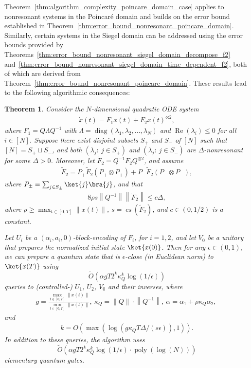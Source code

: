 \documentclass[superscriptaddress,onecolumn,nofootinbib,longbibliography,a4paper,accepted=2026-09-29]{quantumarticle}
\theoremstyle{plain}
\newtheorem{thm}{Theorem}
\theoremstyle{definition}
\numberwithin{thm}{section}
\numberwithin{assumption}{section}
\numberwithin{lemma}{section}
\numberwithin{prop}{section}
\numberwithin{cor}{section}
\numberwithin{definition}{section}
\numberwithin{rmk}{section}
\numberwithin{equation}{section}
\newcommand{\norm}[1]     {\left\| #1 \right\|}
\newcommand{\ot}{\otimes}
\newcommand{\lrb}[1]{\left ( #1 \right )}
\newcommand{\realpart}[1]{\operatorname{Re}\lrb{#1}}
\newcommand{\mypoly}[1]{\operatorname{poly} \lrb{#1}}
\newcommand{\mylog}[1]{\operatorname{log} \lrb{#1}}
\newcommand{\myO}[1]{O\lrb{#1}}
\newcommand{\mytO}[1]{\tilde{O}\lrb{#1}}
\newcommand{\diag}[1]{\operatorname{diag}\lrb{#1}}
\begin{document}
Theorem~\ref{thm:algorithm_complexity_poincare_domain_case} applies to nonresonant systems in the Poincar\'{e} domain and builds on the error bound established in Theorem~\ref{thm:error_bound_nonresonant_poincare_domain}. Similarly, certain systems in the Siegel domain can be addressed using the error bounds provided by Theorems~\ref{thm:error_bound_nonresonant_siegel_domain_decompose_f2} and~\ref{thm:error_bound_nonresonant_siegel_domain_time_dependent_f2}, both of which are derived from Theorem~\ref{thm:error_bound_nonresonant_poincare_domain}. These results lead to the following algorithmic consequences:

\begin{thm}
Consider the $N$-dimensional quadratic ODE system
\begin{align}
    \dot{x}(t) = F_1 x(t) + F_2 x(t)^{\ot 2},
\end{align}
where $F_1=Q\Lambda Q^{-1}$ with $\Lambda=\diag{\lambda_1, \lambda_2, \dots, \lambda_N}$ and $\realpart{\lambda_i} \le 0$ for all $i \in [N]$. Suppose there exist disjoint subsets $S_+$ and $S_-$ of $[N]$ such that $[N]=S_+\sqcup S_-$, and both $\lrb{\lambda_j:~j\in S_+}$ and $\lrb{\lambda_j:~j \in S_-}$ are $\Delta$-nonresonant for some $\Delta>0$. Moreover, let  $\tilde{F}_2=Q^{-1}F_2Q^{\otimes 2}$, and assume 
\begin{align}
\tilde{F}_2=P_+ \tilde{F}_2 (P_+\otimes P_+) + P_- \tilde{F}_2 (P_-\otimes P_-),
\end{align}
where $P_{\pm}=\sum_{j \in S_\pm}\ket{j}\bra{j}$, and that
\begin{align}
8\rho s \norm{Q^{-1}} \norm{\tilde{F}_2} \le c\Delta,    \end{align}
where $\rho \ge \max_{t \in [0, T]} \norm{x(t)}$, $s=\operatorname{cs}(\tilde{F}_2)$, and $c \in (0,1/2)$ is a constant.

Let $U_i$ be a $(\alpha_i, a_i, 0)$-block-encoding of $F_i$, for $i=1,2$, and let $V_0$ be a unitary that prepares the normalized initial state $\ket{x(0)}$. Then for any $\epsilon \in (0, 1)$, we can prepare a quantum state that is $\epsilon$-close (in Euclidean norm) to $\ket{x(T)}$ using 
$$\mytO{\alpha g T  2^k \kappa_Q^k\mylog{1/\epsilon}}$$
queries to (controlled-) $U_1$, $U_2$, $V_0$ and their inverses, where 
\begin{align}
g=\frac{\max_{t \in [0, T]} {\norm{x(t)}}}{\min_{t \in [0, T]} {\norm{x(t)}}},~
\kappa_Q=\norm{Q}\cdot \norm{Q^{-1}},~
\alpha=\alpha_1+{\rho\kappa_Q\alpha_2},~ 
\end{align} 
and
\begin{align}
k=\myO{\max(\mylog{ g  \kappa_Q T\Delta/(s\epsilon)}, 1)}.    
\end{align} 
In addition to these queries, the algorithm uses
$$\mytO{\alpha g T 2^k \kappa_Q^k \mylog{1/\epsilon}\cdot \mypoly{\mylog{N}}}$$
elementary quantum gates.
\label{thm:algorithm_complexity_decomposable_f2_case}
\end{thm}
\end{document}
